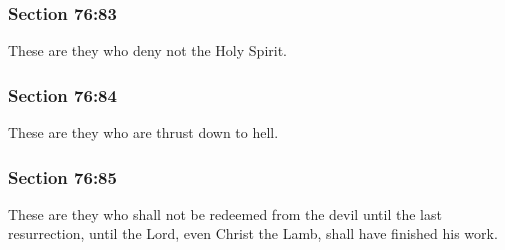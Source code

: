 
	\subsubsection{Section 76:83} %
		\label{DC76-83}

		These are they who deny not the Holy Spirit.


	\subsubsection{Section 76:84} %
		\label{DC76-84}

		These are they who are thrust down to hell.


	\subsubsection{Section 76:85} %
		\label{DC76-85}

		These are they who shall not be redeemed from the devil until the last resurrection, until the Lord, even Christ the Lamb, shall have finished his work.

